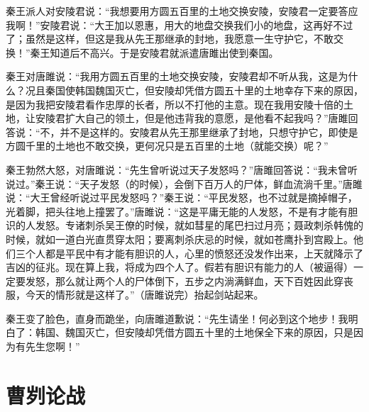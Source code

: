 \documentclass[12pt,UTF-8,openany,a4]{ctexbook}
\begin{document}
\begin{large}\yiwen
    
    秦王派人对安陵君说：“我想要用方圆五百里的土地交换安陵，安陵君一定要答应我啊！”安陵君说：“大王加以恩惠，用大的地盘交换我们小的地盘，这再好不过了；虽然是这样，但这是我从先王那继承的封地，我愿意一生守护它，不敢交换！”秦王知道后不高兴。于是安陵君就派遣唐雎出使到秦国。
    
    秦王对唐雎说：“我用方圆五百里的土地交换安陵，安陵君却不听从我，这是为什么？况且秦国使韩国魏国灭亡，但安陵却凭借方圆五十里的土地幸存下来的原因，是因为我把安陵君看作忠厚的长者，所以不打他的主意。现在我用安陵十倍的土地，让安陵君扩大自己的领土，但是他违背我的意愿，是他看不起我吗？”唐雎回答说：“不，并不是这样的。安陵君从先王那里继承了封地，只想守护它，即使是方圆千里的土地也不敢交换，更何况只是五百里的土地（就能交换）呢？”
    
    秦王勃然大怒，对唐雎说：“先生曾听说过天子发怒吗？”唐雎回答说：“我未曾听说过。”秦王说：“天子发怒（的时候），会倒下百万人的尸体，鲜血流淌千里。”唐雎说：“大王曾经听说过平民发怒吗？”秦王说：“平民发怒，也不过就是摘掉帽子，光着脚，把头往地上撞罢了。”唐雎说：“这是平庸无能的人发怒，不是有才能有胆识的人发怒。专诸刺杀吴王僚的时候，就如彗星的尾巴扫过月亮；聂政刺杀韩傀的时候，就如一道白光直贯穿太阳；要离刺杀庆忌的时候，就如苍鹰扑到宫殿上。他们三个人都是平民中有才能有胆识的人，心里的愤怒还没发作出来，上天就降示了吉凶的征兆。现在算上我，将成为四个人了。假若有胆识有能力的人（被逼得）一定要发怒，那么就让两个人的尸体倒下，五步之内淌满鲜血，天下百姓因此穿丧服，今天的情形就是这样了。”（唐雎说完）抬起剑站起来。
    
    秦王变了脸色，直身而跪坐，向唐雎道歉说：“先生请坐！何必到这个地步！我明白了：韩国、魏国灭亡，但安陵却凭借方圆五十里的土地保全下来的原因，只是因为有先生您啊！”
    

\end{large}



\chapter{曹刿论战}
\end{document}

